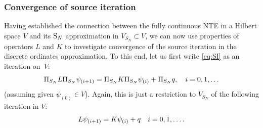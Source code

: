 \subsubsection{Convergence of source iteration} \label{sec:SI}
Having established the connection between the fully continuous NTE in a Hilbert space $V$ and its $\SN$
approximation in $V_{S_N} \subset V$, we can now use properties of operators $L$ and $K$ to
investigate convergence of the source iteration in the discrete ordinates approximation. To this end, let us first write
\eqref{eq:SI} as an iteration on~$V$:
\begin{equation}\label{eq:SISN}
	\Projop[S_N] \op{L} \Projop[S_N] \psi_{(i+1)} = \Projop[S_N] \op{K} \Projop[S_N] \psi_{(i)} +  \Projop[S_N] q,\quad i =
	0,1,\ldots 
\end{equation}
(assuming given $\psi_{(0)} \in V$).
Again, this is just a restriction to $V_{S_N}$ of the following iteration in $V$:
\begin{equation}\label{eq:SIhilbert}
	\op{L} \psi_{(i+1)} = \op{K} \psi_{(i)} + q  \quad i = 0,1,\ldots.
\end{equation}

